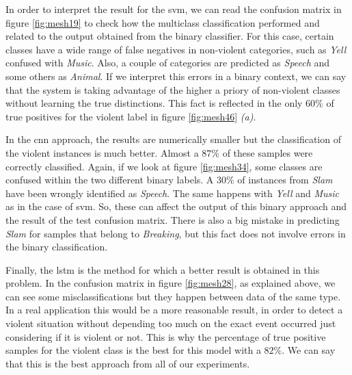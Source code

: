 	In order to interpret the result for the \acrshort{svm}, we can read the confusion matrix in figure \ref{fig:mesh19} to check how the multiclass classification performed and related to the output obtained from the binary classifier. For this case, certain classes have a wide range of false negatives in non-violent categories, such as \textit{Yell} confused with \textit{Music}. Also, a couple of categories are predicted as \textit{Speech} and some others as \textit{Animal}. If we interpret this errors in a binary context, we can say that the system is taking advantage of the higher a priory of non-violent classes without learning the true distinctions. %
	This fact is reflected in the only $60\%$ of true positives for the violent label in figure \ref{fig:mesh46} \textit{(a)}. 
	
	In the \acrshort{cnn} approach, the results are numerically smaller but the classification of the violent instances is much better. Almost a $87\%$ of these samples were correctly classified. Again, if we look at figure \ref{fig:mesh34}, some classes are confused within the two different binary labels. A $30\%$ of instances from \textit{Slam} have been wrongly identified as \textit{Speech}. The same happens with \textit{Yell} and \textit{Music} as in the case of \acrshort{svm}. So, these can affect the output of this binary approach and the result of the test confusion matrix. There is also a big mistake in predicting \textit{Slam} for samples that belong to \textit{Breaking}, but this fact does not involve errors in the binary classification.
	
	Finally, the \acrshort{lstm} is the method for which a better result is obtained in this problem. In the confusion matrix in figure \ref{fig:mesh28}, as explained above, we can see some misclassifications but they happen between data of the same type. In a real application this would be a more reasonable result, in order to detect a violent situation without depending too much on the exact event occurred just considering if it is violent or not. This is why the percentage of true positive samples for the violent class is the best for this model with a $82\%$. We can say that this is the best approach from all of our experiments. %
	
	
		
	